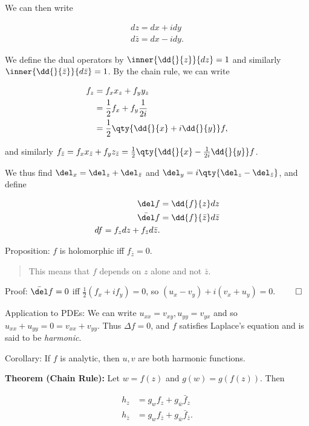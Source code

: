 We can then write

\begin{align*}
dz = dx + idy \\
d\bar z = dx - i dy
.\end{align*}

We define the dual operators by \(\inner{\dd{}{z}}{dz} = 1\) and
similarly \(\inner{ \dd{}{\bar z} }{d\bar z} = 1\). By the chain rule,
we can write

\begin{align*}
f_z &= f_x x_z + f_y y_z \\
&= \frac 1 2 f_x + f_y \frac{1}{2i} \\
&= \frac 1 2 \qty{\dd{}{x} + i \dd{}{y} }f 
,\end{align*}

and similarly
\(f_{\bar z} = f_x x_{\bar z} + f_y z_{\bar z} = \frac 1 2 \qty{ \dd{}{x} - \frac{1}{2i} \dd{}{y} }f\).

We thus find \(\del_x = \del_z + \del_{\bar z}\) and
\(\del_y = i\qty{ \del_z - \del_{\bar z} }\), and define

\begin{align*}
\del f &= \dd{f}{z} dz \\
\bar{\del} f &= \dd{f}{\bar z} d\bar z \\
df = f_z dz + f_{\bar z} d\bar z
.\end{align*}

Proposition: \(f\) is holomorphic iff \(f_{\bar z} = 0\).

\begin{quote}
This means that \(f\) depends on \(z\) alone and not \(\bar z\).
\end{quote}

Proof: \(\bar \del f = 0\) iff \(\frac 1 2 (f_x + if_y) = 0\), so
\((u_x - v_y) + i (v_x + u_y) = 0\). \(\qed\)

Application to PDEs: We can write \(u_{xx} = v_{xy}, u_{yy} = v_{yx}\)
and so \(u_{xx} + u_{yy} = 0 = v_{xx} + v_{yy}\). Thus \(\Delta f = 0\),
and \(f\) satisfies Laplace's equation and is said to be
\emph{harmonic}.

Corollary: If \(f\) is analytic, then \(u, v\) are both harmonic
functions.

\textbf{Theorem (Chain Rule):} Let \(w = f(z)\) and \(g(w) = g(f(z))\).
Then

\begin{align*}
h_z &= g_w f_z + g_{\bar w} \bar f_z \\
h_{\bar z} &= g_w f_{\bar z} + g_{\bar w} \bar f_{\bar z}
.\end{align*}


